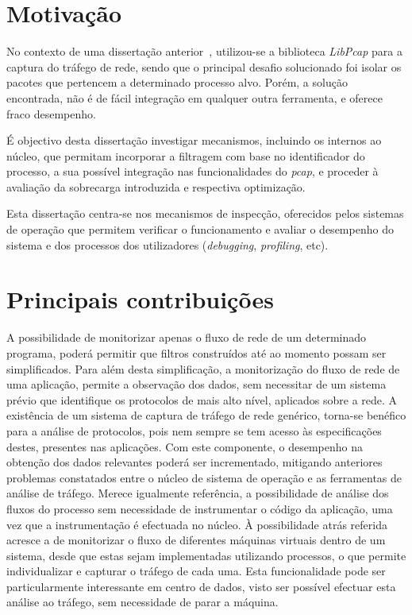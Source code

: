 \section{Motivação}
\label{sub:intro_motivation}

No contexto de uma dissertação anterior~\cite{Farruca:2009}, utilizou-se a biblioteca \textit{LibPcap} para a captura do tráfego de rede, sendo que o principal desafio solucionado foi isolar os pacotes que pertencem a determinado processo alvo.
Porém, a solução encontrada, não é de fácil integração em qualquer outra ferramenta, e oferece fraco desempenho.

É objectivo desta dissertação investigar mecanismos, incluindo os internos ao núcleo, que permitam incorporar a filtragem com base no identificador do processo, a sua possível integração nas funcionalidades do \textit{pcap}, e proceder à avaliação da sobrecarga introduzida e respectiva optimização.

Esta dissertação centra-se nos mecanismos de inspecção, oferecidos pelos sistemas de operação que permitem verificar o funcionamento e avaliar o desempenho do sistema e dos processos dos utilizadores (\textit{debugging}, \textit{profiling}, etc).

\section{Principais contribuições} 
\label{sec:intro_contribuicoes}

A possibilidade de monitorizar apenas o fluxo de rede de um determinado programa, poderá permitir que filtros construídos até ao momento possam ser simplificados.
Para além desta simplificação, a monitorização do fluxo de rede de uma aplicação, permite a observação dos dados, sem necessitar de um sistema prévio que identifique os protocolos de mais alto nível, aplicados sobre a rede.
A existência de um sistema de captura de tráfego de rede genérico, torna-se benéfico para a análise de protocolos, pois nem sempre se tem acesso às especificações destes, presentes nas aplicações.
Com este componente, o desempenho na obtenção dos dados relevantes poderá ser incrementado, mitigando anteriores problemas constatados entre o núcleo de sistema de operação e as ferramentas de análise de tráfego.
Merece igualmente referência, a possibilidade de análise dos fluxos do processo sem necessidade de instrumentar o código da aplicação, uma vez que a instrumentação é efectuada no núcleo.
À possibilidade atrás referida acresce a de monitorizar o fluxo de diferentes máquinas virtuais dentro de um sistema, desde que estas sejam implementadas utilizando processos, o que permite individualizar e capturar o tráfego de cada uma.
Esta funcionalidade pode ser particularmente interessante em centro de dados, visto ser possível efectuar esta análise ao tráfego, sem necessidade de parar a máquina.

